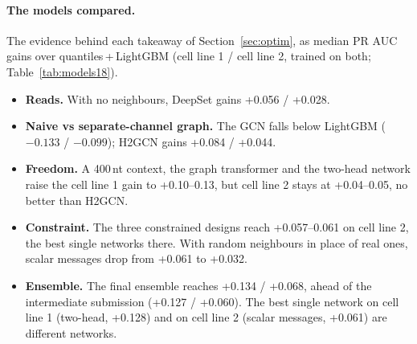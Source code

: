 \documentclass[11pt,a4paper]{article}
\begin{document}
\paragraph{The models compared.}
The evidence behind each takeaway of Section~\ref{sec:optim}, as median PR AUC
gains over quantiles\,+\,LightGBM (cell line 1 / cell line 2, trained on both;
Table~\ref{tab:models18}).
\begin{itemize}
    \item \textbf{Reads.} With no neighbours, DeepSet gains +0.056 / +0.028.
    \item \textbf{Naive vs separate-channel graph.} The GCN falls below
    LightGBM ($-0.133$ / $-0.099$); H2GCN gains +0.084 / +0.044.
    \item \textbf{Freedom.} A 400\,nt context, the graph transformer and the
    two-head network raise the cell line 1 gain to +0.10--0.13, but cell line
    2 stays at +0.04--0.05, no better than H2GCN.
    \item \textbf{Constraint.} The three constrained designs reach
    +0.057--0.061 on cell line 2, the best single networks there. With random
    neighbours in place of real ones, scalar messages drop from +0.061 to
    +0.032.
    \item \textbf{Ensemble.} The final ensemble reaches +0.134 / +0.068, ahead
    of the intermediate submission (+0.127 / +0.060). The best single network
    on cell line 1 (two-head, +0.128) and on cell line 2 (scalar messages,
    +0.061) are different networks.
\end{itemize}
\end{document}
